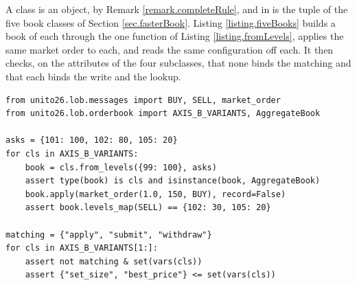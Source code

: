 A class is an object, by Remark \ref{remark.completeRule},
and  in 
is the tuple of the five book classes of Section \ref{sec.fasterBook}.
Listing \ref{listing.fiveBooks} builds a book of each
through the one function  of Listing \ref{listing.fromLevels},
applies the same market order to each,
and reads the same configuration off each.
It then checks, on the attributes of the four subclasses,
that none binds the matching and that each binds the write and the lookup.

\begin{lstlisting}[caption={Five classes, one matching, one configuration.}, label=listing.fiveBooks]
from unito26.lob.messages import BUY, SELL, market_order
from unito26.lob.orderbook import AXIS_B_VARIANTS, AggregateBook

asks = {101: 100, 102: 80, 105: 20}
for cls in AXIS_B_VARIANTS:
    book = cls.from_levels({99: 100}, asks)
    assert type(book) is cls and isinstance(book, AggregateBook)
    book.apply(market_order(1.0, 150, BUY), record=False)
    assert book.levels_map(SELL) == {102: 30, 105: 20}

matching = {"apply", "submit", "withdraw"}
for cls in AXIS_B_VARIANTS[1:]:
    assert not matching & set(vars(cls))
    assert {"set_size", "best_price"} <= set(vars(cls))
\end{lstlisting}
